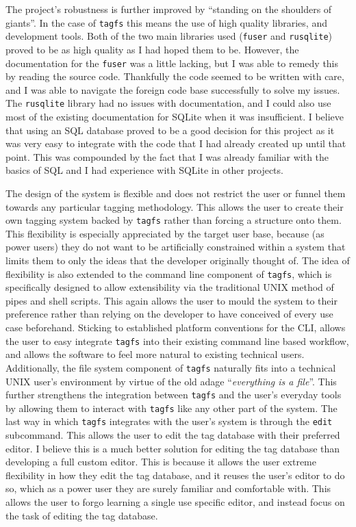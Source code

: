 The project's robustness is further improved by ``standing on the shoulders of
giants''. In the case of \texttt{tagfs} this means the use of high quality
libraries, and development tools. Both of the two main libraries used
(\texttt{fuser} and \texttt{rusqlite}) proved to be as high quality as I had
hoped them to be. However, the documentation for the \texttt{fuser} was a
little lacking, but I was able to remedy this by reading the source code.
Thankfully the code seemed to be written with care, and I was able to navigate
the foreign code base successfully to solve my issues. The \texttt{rusqlite}
library had no issues with documentation, and I could also use most of the
existing documentation for SQLite when it was insufficient. I believe that
using an SQL database proved to be a good decision for this project as it was
very easy to integrate with the code that I had already created up until that
point. This was compounded by the fact that I was already familiar with the
basics of SQL and I had experience with SQLite in other projects.

The design of the system is flexible and does not restrict the user or funnel
them towards any particular tagging methodology. This allows the user to create
their own tagging system backed by \texttt{tagfs} rather than forcing a
structure onto them. This flexibility is especially appreciated by the target
user base, because (as power users) they do not want to be artificially
constrained within a system that limits them to only the ideas that the
developer originally thought of. The idea of flexibility is also extended to
the command line component of \texttt{tagfs}, which is specifically designed to
allow extensibility via the traditional UNIX method of pipes and shell scripts.
This again allows the user to mould the system to their preference rather than
relying on the developer to have conceived of every use case beforehand.
Sticking to established platform conventions for the CLI, allows the user to
easy integrate \texttt{tagfs} into their existing command line based workflow,
and allows the software to feel more natural to existing technical users.
Additionally, the file system component of \texttt{tagfs} naturally fits into a
technical UNIX user's environment by virtue of the old adage ``\emph{everything
is a file}''. This further strengthens the integration between \texttt{tagfs}
and the user's everyday tools by allowing them to interact with \texttt{tagfs}
like any other part of the system. The last way in which \texttt{tagfs}
integrates with the user's system is through the \texttt{edit} subcommand. This
allows the user to edit the tag database with their preferred editor. I believe
this is a much better solution for editing the tag database than developing a
full custom editor. This is because it allows the user extreme flexibility in
how they edit the tag database, and it reuses the user's editor to do so, which
as a power user they are surely familiar and comfortable with. This allows the
user to forgo learning a single use specific editor, and instead focus on the
task of editing the tag database.

